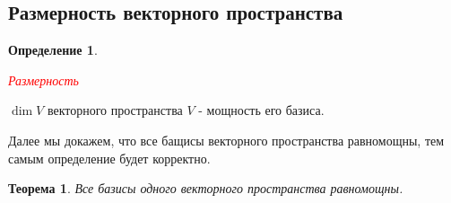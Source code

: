 \documentclass[a4paper,100pt]{article}
\theoremstyle{indented}
\newtheorem{theorem}{Теорема}
\theoremstyle{definition}
\newtheorem{defn}{Определение}
\theoremstyle{remark}
\begin{document}
\resetall

\subsection{Размерность векторного пространства}

\begin{defn}
    \hypertarget{n47}{\textcolor{red}{\textit{Размерность}}} $\dim V$ векторного пространства $V$ - мощность его базиса.
\end{defn}

Далее мы докажем, что все бащисы векторного пространства равномощны, тем самым определение будет корректно.\\

\begin{theorem}
    Все базисы одного векторного пространства равномощны.
\end{theorem}
\end{document}
